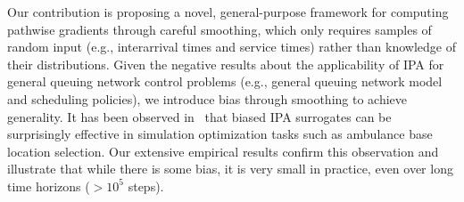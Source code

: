 Our contribution is proposing a novel, general-purpose framework for computing pathwise gradients through careful smoothing, which only requires samples of random input (e.g., interarrival times and service times) rather than knowledge of their distributions.
Given the negative results about the applicability of IPA for general queuing network control problems (e.g., general queuing network model and scheduling policies), we introduce bias through smoothing to achieve generality. It has been observed in~\cite{eckman2020biased} that biased IPA surrogates can be surprisingly effective in simulation optimization tasks such as ambulance base location selection. Our extensive empirical results confirm this observation and illustrate that while there is some bias, it is very small in practice, even over long time horizons ($>10^5$ steps).


